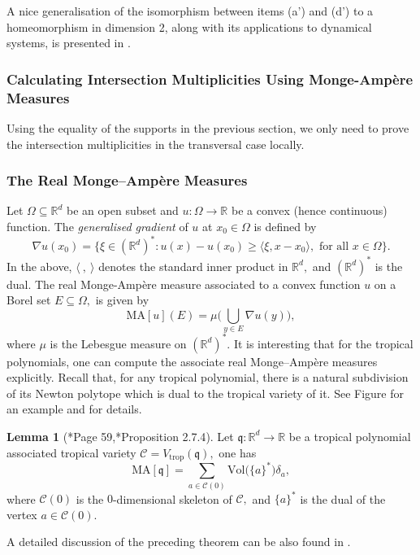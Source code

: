 \documentclass[11pt]{amsart}
\theoremstyle{definition}
\newtheorem{lemma}[theorem]{Lemma}
\newcommand{\R}{\mathbb{R}}
\newcommand{\lto}{\longrightarrow}
\newcommand{\cC}{\mathcal{C}}
\newcommand{\fq}{\mathfrak{q}}
\begin{document}
A nice generalisation of the isomorphism between items (a') and (d') to a homeomorphism in dimension 2, along with its applications to dynamical systems, is presented in \cite{DillerRoeder2025}.



\subsubsection{Calculating Intersection Multiplicities Using Monge-Amp\`ere Measures}
Using the equality of the supports in the previous section, we only need to prove the intersection multiplicities in the transversal case locally. 


\subsubsection{The Real Monge--Amp\`ere Measures }
Let $\Omega\subseteq \R^d$ be an open subset and $u:\Omega \lto \R$ be a convex (hence continuous) function. The \emph{generalised gradient} of $u$ at $x_0\in \Omega$ is defined by 
$$
\nabla u(x_0) = \big\{\xi \in (\R^d)^*: u(x)-u(x_0) \geq \langle \xi , x- x_0 \rangle, \text{ for all $x\in \Omega$}   \big\}.
$$
In the above, $\langle ~ , ~ \rangle$ denotes the standard inner product in $\R^d,$ and $(\R^d)^*$ is the dual. The real Monge-Amp\`ere measure associated to a convex function $u$ on a Borel set $E \subseteq \Omega,$ is given by
$$
\textrm{MA} [u](E)  =  \mu \big( \bigcup_{y \in E} \nabla u (y)  \big),
$$
where $\mu$ is the Lebesgue measure on $(\R^d)^*.$
\vskip 2mm
It is interesting that for the tropical polynomials, one can compute the associate real Monge--Amp\`ere measures explicitly. Recall that, for any tropical polynomial, there is a natural subdivision of its Newton polytope which is dual to the tropical variety of it. See Figure for an example and \cite{brugale-a-bit, Maclagan-Sturmfels} for details. 


\begin{lemma}[\cite{yger}*{Page 59},\cite{GPS}*{Proposition 2.7.4}]\label{lem:real-MA-dec}
    Let $\fq:\R^d \lto \R$ be a tropical polynomial associated tropical variety $\cC = V_{\textrm{trop}}(\fq),$ one has
    $$
     \textrm{MA}[\fq] = \sum_{a \in  \cC(0)} \textrm{Vol} \big(\{ a\}^* \big) \delta_{a},
    $$
where $\cC(0)$ is the $0$-dimensional skeleton of $\cC,$ and $\{ a\}^*$ is the dual of the vertex $a\in \cC(0).$     
\end{lemma}
\noindent
A detailed discussion of the preceding theorem can be also found in \cite{Babaee}. 
\end{document}
